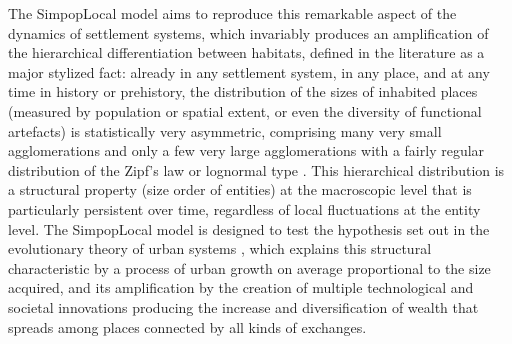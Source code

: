 \documentclass[10pt]{article}
\begin{document}
The SimpopLocal model aims to reproduce this remarkable aspect of the dynamics of settlement systems, which invariably produces an amplification of the hierarchical differentiation between habitats, defined in the literature as a major stylized fact: already in any settlement system, in any place, and at any time in history or prehistory, the distribution of the sizes of inhabited places (measured by population or spatial extent, or even the diversity of functional artefacts) is statistically very asymmetric, comprising many very small agglomerations and only a few very large agglomerations with a fairly regular distribution of the Zipf’s law or lognormal type \citep{fletcher1986settlement,liu1996settlement}. This hierarchical distribution is a structural property (size order of entities) at the macroscopic level that is particularly persistent over time, regardless of local fluctuations at the entity level. The SimpopLocal model is designed to test the hypothesis set out in the evolutionary theory of urban systems \citep{pumain1997pour}, which explains this structural characteristic by a process of urban growth on average proportional to the size acquired, and its amplification by the creation of multiple technological and societal innovations producing the increase and diversification of wealth that spreads among places connected by all kinds of exchanges.
\end{document}
